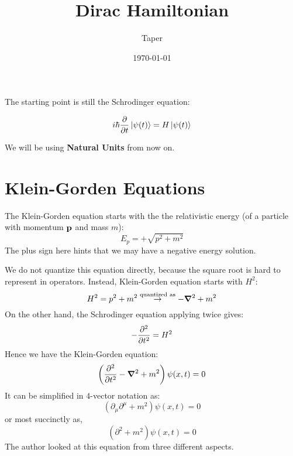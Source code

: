 \documentclass{article}
\title{Dirac Hamiltonian}
\date{\today}
\author{Taper}
\begin{document}
\maketitle
{}
\tableofcontents

The starting point is still the Schrodinger equation:

\begin{equation}
    i\hbar \pdv{t}\ket{\psi(t)} = H\ket{\psi(t)}
\end{equation}

We will be using \textbf{Natural Units} from now on.

\section{Klein-Gorden Equations}
\label{sec:Klien-Gorden Equations}

The Klein-Gorden equation starts with the the relativistic energy (of
a particle with momentum $\vb{p}$ and mass $m$):
\begin{equation}
    E_p = +\sqrt{p^2+m^2}
\end{equation}
The plus sign here hints that we may have a negative energy solution.

We do not quantize this equation directly, because the square root is
hard to represent in operators. Instead, Klein-Gorden equation starts
with $H^2$:
\begin{equation}
    H^2 = p^2 + m^2 \overset{\text{quantized as}}{\to}
    -\grad^2 + m^2
\end{equation}
On the other hand, the Schrodinger equation applying twice gives:
\begin{equation}
    -\pdv[2]{t} = H^2
\end{equation}
Hence we have the Klein-Gorden equation:
\begin{equation}
    \label{eq:kg-eq}
    \left(\pdv[2]{t} - \grad^2 + m^2\right) \psi(x,t) = 0
\end{equation}
It can be simplified in $4$-vector notation as:
\begin{equation}
    \label{eq:kg-eq-4vec}
    \left(\partial_\mu \partial^\mu + m^2\right) \psi(x,t) = 0
\end{equation}
or most succinctly as,
\begin{equation}
    \left(\partial^2 + m^2\right) \psi(x,t) = 0
\end{equation}
The author looked at this equation from three different aspects.
\end{document}
